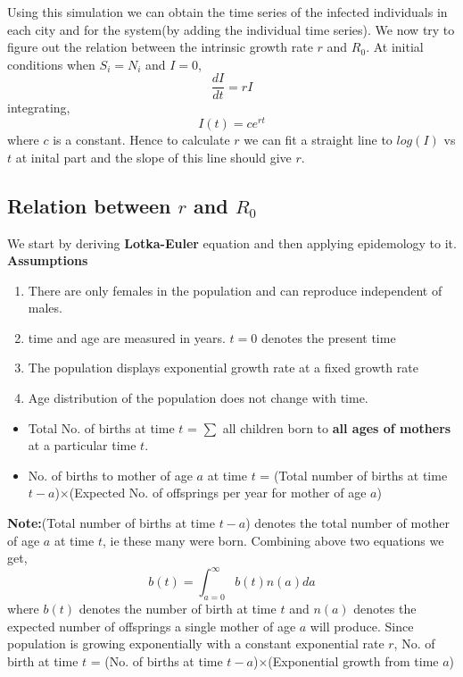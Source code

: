 \documentclass{article}
\begin{document}
Using this simulation we can obtain the time series of the infected
individuals in each city and for the system(by adding the individual
time series). We now try to figure out the relation between the
intrinsic growth rate $r$ and $R_{0}$. At initial conditions when
$S_{i}=N_{i}$ and $I=0$, $$\frac{dI}{dt}=rI$$
integrating, $$I(t)=ce^{rt}$$ where $c$ is a constant. Hence to
calculate $r$ we can fit a straight line to $log(I)$ vs $t$ at inital
part and the slope of this line should give $r$.
\subsection{Relation between $r$ and $R_{0}$}
We start by deriving \textbf{Lotka-Euler} equation and then applying epidemology to it.\newline
\textbf{Assumptions} 
\begin{enumerate}
\item There are only females in the population and can reproduce independent of males.
\item time and age are measured in years. $t=0$ denotes the present time
\item The population displays exponential growth rate at a fixed growth rate
\item Age distribution of the population does not change with time.
\end{enumerate}
\begin{itemize}
  \item Total No. of births at time $t$ = $\sum$ all children born to
    \textbf{all ages of mothers} at a particular time $t$.
  \item No. of births to mother of age $a$ at time $t$ = (Total number of births at time $t-a$)$\times$(Expected No. of offsprings per year for mother of age $a$)
\end{itemize}
\textbf{Note:}(Total number of births at time $t-a$) denotes the total
number of mother of age $a$ at time $t$, ie these many were born. \newline
Combining above two equations we get,
$$b(t)=\int_{a=0}^{\infty}b(t)n(a)da$$ where $b(t)$ denotes the number
of birth at time $t$ and $n(a)$ denotes the expected number of offsprings a
single mother of age $a$ will produce. \newline Since population is
growing exponentially with a constant exponential rate $r$,\newline
No. of birth at time $t$ = (No. of births at time
$t-a$)$\times$(Exponential growth from time $a$)
\end{document}
